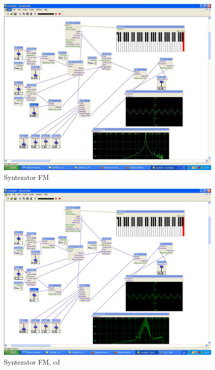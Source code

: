 \documentclass[a4paper,12pt]{article}
\begin{document}
\begin{figure}[h]
\hspace{-2.5cm}
\includegraphics[scale=0.4]{2-01.PNG}
\caption{Syntezator FM}
\label{fig:FM1}
\end{figure}
\begin{figure}[h]
\hspace{-2.5cm}
\includegraphics[scale=0.4]{2-02.PNG}
\caption{Syntezator FM, cd}
\label{fig:FM2}
\end{figure}
\end{document}
